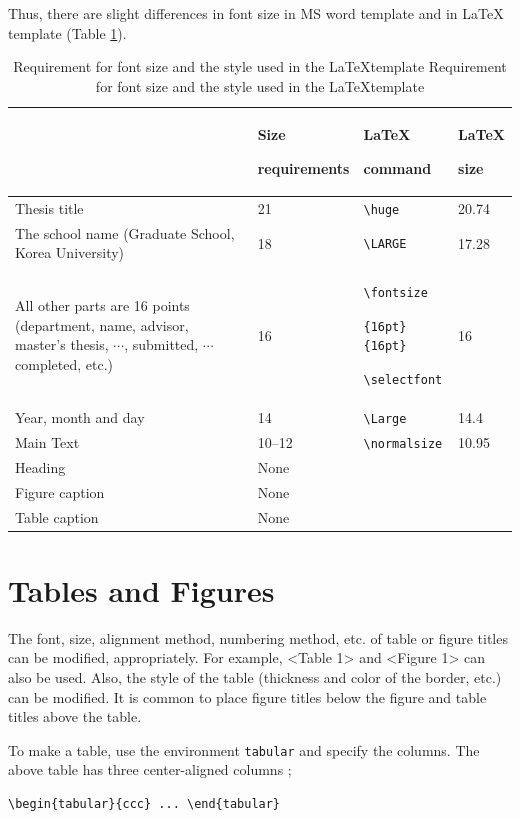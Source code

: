 \documentclass[11pt]{report}
\begin{document}
Thus, there are slight differences in font size in MS word template and in \LaTeX ~ template
(Table \ref{tab:font size}). 

\begin{table}
\caption{Requirement for font size and the style used in the \LaTeX template Requirement for font size and the style used in the \LaTeX template}\label{tab:font size}
\bigskip
\begin{tabular}{>{\centering\arraybackslash}p{5.5cm}p{2.5cm}p{2.5cm}p{1.5cm}}
\toprule
&Size \par requirements & \LaTeX \par command & \LaTeX \par size \\\midrule
Thesis title			&21&\verb|\huge| & 20.74 \\\midrule
The school name (Graduate School, Korea University)
					&18&\verb|\LARGE| & 17.28 \\\midrule
All other parts are 16 points (department, name, advisor, master's thesis, \(\cdots\), submitted, \(\cdots\) completed, etc.)	
					&16&\verb|\fontsize| \par \verb|{16pt}{16pt}| \par \verb|\selectfont|  & 16 \\\midrule

Year, month and day	&14&\verb|\Large| & 14.4  \\\midrule
Main Text			&10--12&\verb|\normalsize| & 10.95 \\\midrule
Heading				&None&\\\midrule
Figure caption			&None&\\\midrule
Table caption			&None&\\\bottomrule
\end{tabular}
\end{table}

\section{Tables and Figures}\label{sec:table_figure}
The font, size, alignment method, numbering method, etc. of table or figure titles can be modified, appropriately. For example, <Table 1> and <Figure 1> can also be used. Also, the style of the table (thickness and color of the border, etc.) can be modified. It is common to place figure titles below the figure and table titles above the table.

To make a table, use the environment \texttt{tabular} and specify the columns.
The above table has three center-aligned columns ;
\begin{verbatim}
\begin{tabular}{ccc} ... \end{tabular}
\end{verbatim}
\end{document}
